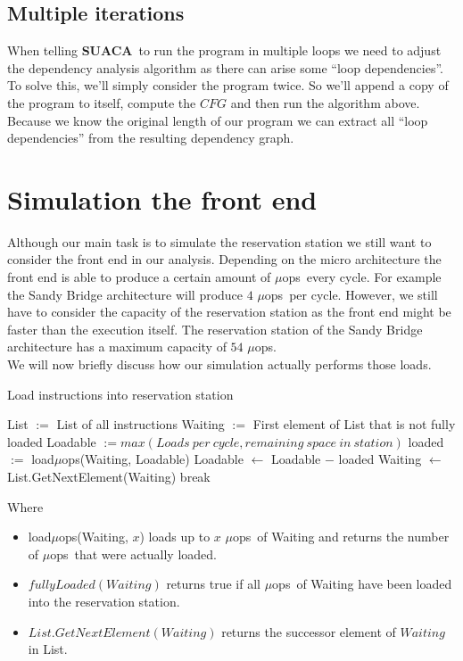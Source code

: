 \documentclass[a4paper,12pt,titlepage, twoside]{report}
\newcommand{\suaca}{\textbf{SUACA}}
\newcommand{\microops}{$\mu$ops}
\begin{document}
\subsection{Multiple iterations}

When telling \suaca\ to run the program in multiple loops we need to adjust the dependency analysis algorithm as there can arise some ``loop dependencies''. To solve this, we'll simply consider the program twice. So we'll append a copy of the program to itself, compute the $CFG$ and then run the algorithm above. Because we know the original length of our program we can extract all ``loop dependencies'' from the resulting dependency graph.


\section{Simulation the front end}
\label{sec:simfrontend}

Although our main task is to simulate the reservation station we still want to consider the front end in our analysis. Depending on the micro architecture the front end is able to produce a certain amount of \microops\ every cycle. For example the Sandy Bridge architecture will produce $4$ \microops\ per cycle. However, we still have to consider the capacity of the reservation station as the front end might be faster than the execution itself. The reservation station of the Sandy Bridge architecture has a maximum capacity of $54$ \microops.\\
We will now briefly discuss how our simulation actually performs those loads.

\begin{algorithm}[H]
    \SetAlgoLined
    \caption{Load instructions into reservation station}
    List $:=$ List of all instructions\;
    Waiting $:=$ First element of List that is not fully loaded\;
    Loadable $:= max(Loads\ per\ cycle, remaining\ space\ in\ station)$\;
     {
        loaded $:=$ load\microops(Waiting, Loadable)\;
        Loadable $\leftarrow$ Loadable $-$ loaded\;
         {
            Waiting $\leftarrow$ List.GetNextElement(Waiting)\;
        } {
            break\;
        }
    }
\end{algorithm}

Where
\begin{itemize}
    \item load\microops(Waiting, $x$) loads up to $x$ \microops\ of Waiting and returns the number of \microops\ that were actually loaded.
    \item $fullyLoaded(Waiting)$ returns true if all \microops\ of Waiting have been loaded into the reservation station.
    \item $List.GetNextElement(Waiting)$ returns the successor element of $Waiting$ in List.
\end{itemize}
\end{document}
